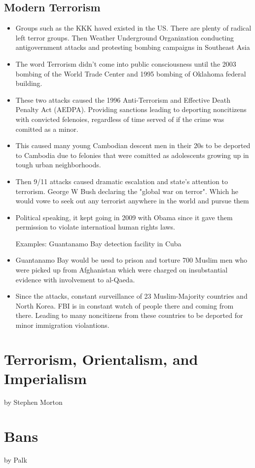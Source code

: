 \documentclass{article}
\begin{document}
\subsection{Modern Terrorism}
\begin{itemize}
  \item Groups such as the KKK haved existed in the US.
    There are plenty of radical left terror groups.
    Then Weather Underground Organization conducting antigovernment attacks
    and protesting bombing campaigns in Southeast Asia
  \item The word Terrorism didn't come into public consciousness until the 2003 bombing
    of the World Trade Center and 1995 bombing of Oklahoma federal building.
  \item These two attacks caused the 1996 Anti-Terrorism and Effective
    Death Penalty Act (AEDPA).
    Providing sanctions leading to deporting noncitizens with convicted felenoies,
    regardless of time served of if the crime was comitted as a minor.
  \item This caused many young Cambodian descent men in their 20s to be deported
    to Cambodia due to felonies that were comitted as adolescents growing up
    in tough urban neighborhoods.
  \item Then 9/11 attacks caused dramatic escalation and state's attention to terrorism.
    George W Bush declaring the "global war on terror".
    Which he would vowe to seek out any terrorist anywhere in the world and pursue them
  \item Political speaking, it kept going in 2009 with Obama since it gave them
    permission to violate internatioal human rights laws. 

    Examples:
    Guantanamo Bay detection facility in Cuba
  \item Guantanamo Bay would be uesd to prison and torture 700 Muslim men who were
    picked up from Afghanistan which were charged on insubstantial evidence with
    involvement to al-Qaeda.
  \item Since the attacks, constant surveillance of 23 Muslim-Majority countries and
    North Korea. FBI is in constant watch of people there and coming from there.
    Leading to many noncitizens from these countries to be deported
    for minor immigration violantions.

\end{itemize}


\section{Terrorism, Orientalism, and Imperialism}
by Stephen Morton

\section{Bans}
by Palk
\end{document}
